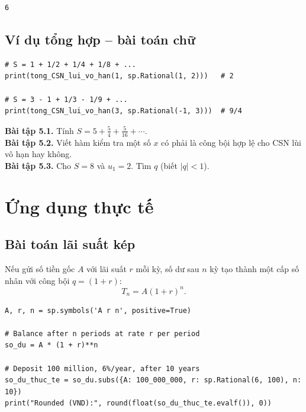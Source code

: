 \documentclass[12pt,a4paper]{report}
\begin{document}
\begin{lstlisting}[style=outstyle,numbers=none]
6
\end{lstlisting}

\section{Ví dụ tổng hợp -- bài toán chữ}

\begin{lstlisting}[caption={Tính tổng chuỗi hình học hội tụ}]
# S = 1 + 1/2 + 1/4 + 1/8 + ...
print(tong_CSN_lui_vo_han(1, sp.Rational(1, 2)))   # 2

# S = 3 - 1 + 1/3 - 1/9 + ...
print(tong_CSN_lui_vo_han(3, sp.Rational(-1, 3)))  # 9/4
\end{lstlisting}

\begin{exbox}
\textbf{Bài tập 5.1.} Tính $S = 5 + \tfrac{5}{4} + \tfrac{5}{16} +
\cdots$.\\[2pt]
\textbf{Bài tập 5.2.} Viết hàm kiểm tra một số $x$ có phải là công bội
hợp lệ cho CSN lùi vô hạn hay không.\\[2pt]
\textbf{Bài tập 5.3.} Cho $S = 8$ và $u_1 = 2$. Tìm $q$ (biết
$|q| < 1$).
\end{exbox}

\newpage

\chapter{Ứng dụng thực tế}

\section{Bài toán lãi suất kép}

Nếu gửi số tiền gốc $A$ với lãi suất $r$ mỗi kỳ, số dư sau $n$ kỳ tạo
thành một cấp số nhân với công bội $q = (1+r)$:
\[
T_n = A (1 + r)^n.
\]

\begin{lstlisting}[caption={Tính số dư sau n năm gửi tiết kiệm lãi kép}]
A, r, n = sp.symbols('A r n', positive=True)

# Balance after n periods at rate r per period
so_du = A * (1 + r)**n

# Deposit 100 million, 6%/year, after 10 years
so_du_thuc_te = so_du.subs({A: 100_000_000, r: sp.Rational(6, 100), n: 10})
print("Rounded (VND):", round(float(so_du_thuc_te.evalf()), 0))
\end{lstlisting}
\end{document}

